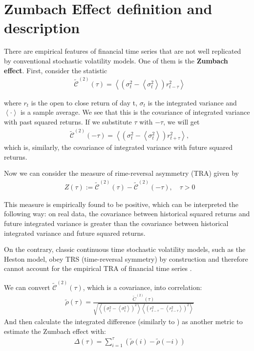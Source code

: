 \section{Zumbach Effect definition and description}
There are empirical features of financial time series that are not well replicated by conventional stochastic volatility models. One of them is the \textbf{Zumbach effect}.
First, consider the statistic
\begin{align}
& \tilde{\mathcal{C}}^{(2)}(\tau)=\left\langle\left(\sigma_{t}^{2}-\left\langle\sigma_{t}^{2}\right\rangle\right) r_{t-\tau}^{2}\right\rangle \label{Cplus}
\end{align}

where $r_t$ is the open to close return of day t, $\sigma_t$ is the integrated variance and $\left\langle \cdot \right\rangle$ is a sample average.
We see that this is the covariance of integrated variance with
past squared returns. If we substitute $\tau$ with $-\tau$, we will get 
\begin{align}
& \tilde{\mathcal{C}}^{(2)}(-\tau)=\left\langle\left(\sigma_{t}^{2}-\left\langle\sigma_{t}^{2}\right\rangle\right) r_{t+\tau}^{2}\right\rangle, \label{Cminus}
\end{align}
which is, similarly, the covariance of integrated variance with future squared returns.

Now we can consider the measure of rime-reversal asymmetry (TRA) given by
\begin{align}
& Z(\tau):=\tilde{\mathcal{C}}^{(2)}(\tau)-\tilde{\mathcal{C}}^{(2)}(-\tau), \quad \tau>0 \label{Zed}
\end{align}

This measure is empirically found to be positive, which can be interpreted the following way: on real data, the covariance between historical squared returns and future integrated variance is greater than the covariance between historical integrated variance and
future squared returns.

On the contrary, classic continuous time stochastic volatility models, such as the Heston model, obey TRS (time-reversal symmetry) by construction and therefore cannot account for the empirical TRA of financial time series \cite{BDB17}.



We can convert $\tilde{\mathcal{C}}^{(2)}(\tau)$, which is a covariance, into correlation:
\begin{align}
& \tilde{\rho}(\tau)=\frac{\tilde{C}^{(2)}(\tau)}{\sqrt{\left\langle\left(\sigma_{t}^{2}-\left\langle\sigma_{t}^{2}\right\rangle\right)^{2}\right\rangle\left\langle\left(r_{t-\tau}^{2}-\left\langle r_{t-\tau}^{2}\right\rangle\right)^{2}\right\rangle}} \label{rho}
\end{align}
And then calculate the integrated difference (similarly to \cite{CB14}) as another metric to estimate the Zumbach effect with:
\begin{align}
& \Delta(\tau)=\sum_{i=1}^{\tau}(\tilde{\rho}(i)-\tilde{\rho}(-i)) \label{Delta}
\end{align}




